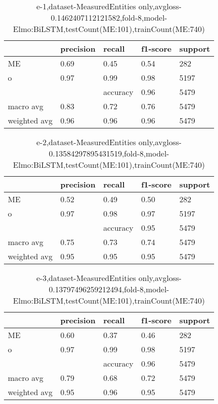 \begin{table}[!ht] 
\centering
\caption{e-1,dataset-MeasuredEntities only,avgloss-0.1462407112121582,fold-8,model-Elmo:BiLSTM,testCount(ME:101),trainCount(ME:740)}\label{e-1data-meS.tsv}
\begin{tabularx}{300pt}{|X|X|X|X|X|}
\hline
&precision&recall&f1-score&support\\
\hline
ME&0.69&0.45&0.54&282\\
\hline
o&0.97&0.99&0.98&5197\\
\hline
&&accuracy&0.96&5479\\
\hline
macro avg&0.83&0.72&0.76&5479\\
\hline
weighted avg&0.96&0.96&0.96&5479\\
\hline
\end{tabularx}
\end{table}
\begin{table}[!ht] 
\centering
\caption{e-2,dataset-MeasuredEntities only,avgloss-0.13584297895431519,fold-8,model-Elmo:BiLSTM,testCount(ME:101),trainCount(ME:740)}\label{e-2data-meS.tsv}
\begin{tabularx}{300pt}{|X|X|X|X|X|}
\hline
&precision&recall&f1-score&support\\
\hline
ME&0.52&0.49&0.50&282\\
\hline
o&0.97&0.98&0.97&5197\\
\hline
&&accuracy&0.95&5479\\
\hline
macro avg&0.75&0.73&0.74&5479\\
\hline
weighted avg&0.95&0.95&0.95&5479\\
\hline
\end{tabularx}
\end{table}
\begin{table}[!ht] 
\centering
\caption{e-3,dataset-MeasuredEntities only,avgloss-0.13797496259212494,fold-8,model-Elmo:BiLSTM,testCount(ME:101),trainCount(ME:740)}\label{e-3data-meS.tsv}
\begin{tabularx}{300pt}{|X|X|X|X|X|}
\hline
&precision&recall&f1-score&support\\
\hline
ME&0.60&0.37&0.46&282\\
\hline
o&0.97&0.99&0.98&5197\\
\hline
&&accuracy&0.96&5479\\
\hline
macro avg&0.79&0.68&0.72&5479\\
\hline
weighted avg&0.95&0.96&0.95&5479\\
\hline
\end{tabularx}
\end{table}
